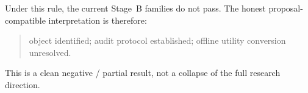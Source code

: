 Under this rule, the current Stage~B families do not pass. The honest proposal-compatible interpretation is therefore:

\begin{quote}
object identified; audit protocol established; offline utility conversion unresolved.
\end{quote}

This is a clean negative / partial result, not a collapse of the full research direction.

